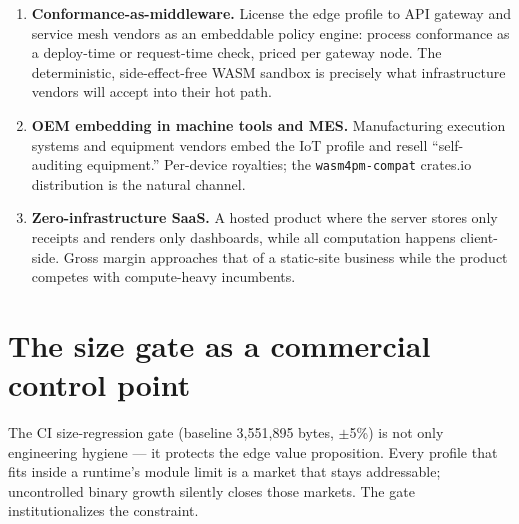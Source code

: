 \begin{enumerate}[leftmargin=2em]
  \item \textbf{Conformance-as-middleware.} License the edge profile to API
    gateway and service mesh vendors as an embeddable policy engine:
    process conformance as a deploy-time or request-time check, priced
    per gateway node. The deterministic, side-effect-free WASM sandbox is
    precisely what infrastructure vendors will accept into their hot path.
  \item \textbf{OEM embedding in machine tools and MES.} Manufacturing
    execution systems and equipment vendors embed the IoT profile and
    resell ``self-auditing equipment.'' Per-device royalties; the
    \texttt{wasm4pm-compat} crates.io distribution is the natural channel.
  \item \textbf{Zero-infrastructure SaaS.} A hosted product where the
    server stores only receipts and renders only dashboards, while all
    computation happens client-side. Gross margin approaches that of a
    static-site business while the product competes with compute-heavy
    incumbents.
\end{enumerate}

\section{The size gate as a commercial control point}

The CI size-regression gate (baseline 3{,}551{,}895 bytes, $\pm$5\%) is not
only engineering hygiene --- it protects the edge value proposition. Every
profile that fits inside a runtime's module limit is a market that stays
addressable; uncontrolled binary growth silently closes those markets. The
gate institutionalizes the constraint.

